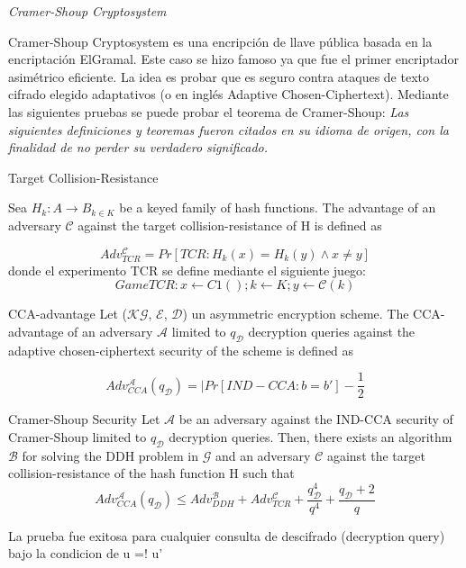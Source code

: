 \documentclass[runningheads,a4paper]{llncs}
\begin{document}
\centerline{\emph{Cramer-Shoup Cryptosystem}}

Cramer-Shoup Cryptosystem es una encripción de llave pública basada en la encriptación ElGramal. Este caso se hizo famoso ya que fue el primer encriptador asimétrico eficiente. La idea es probar que es seguro contra ataques de texto cifrado elegido adaptativos (o en inglés Adaptive Chosen-Ciphertext).
Mediante las siguientes pruebas se puede probar el teorema de Cramer-Shoup:
\emph{Las siguientes definiciones y teoremas fueron citados en su idioma de origen, con la finalidad de no perder su verdadero significado.}
\begin{definition}{Target Collision-Resistance}

Sea $H_k : A \rightarrow B_{k∈K}$ be a keyed family of hash
functions. The advantage of an adversary $\mathcal{C}$ against the target collision-resistance of H is defined as

	\[Adv_{TCR}^\mathcal{C} = Pr[TCR:H_k(x) = H_k (y) \land x \neq y]\]
	donde el experimento TCR se define mediante el siguiente juego:
	\[Game TCR : x \leftarrow C 1 ( ); k \leftarrow K; y \leftarrow \mathcal{C}(k)\]
\end{definition}

\begin{definition}{CCA-advantage}
Let ($\mathcal{K}\mathcal{G}$, $\mathcal{E}$, $\mathcal{D}$) un asymmetric encryption scheme. The CCA-advantage of an adversary $\mathcal{A}$ limited to $q_\mathcal{D}$ decryption queries against the adaptive chosen-ciphertext security of the scheme is defined as

\[Adv_{CCA}^\mathcal{A} (q_\mathcal{D})= |Pr[IND-CCA: b=b'] - \frac{1}{2}\]
\end{definition}

\begin{theorem}{Cramer-Shoup Security}
Let $\mathcal{A}$ be an adversary against the IND-CCA security
of Cramer-Shoup limited to $q_\mathcal{D}$ decryption queries. Then, there exists an algorithm $\mathcal{B}$ for solving the
DDH problem in $\mathcal{G}$ and an adversary $\mathcal{C}$ against the target collision-resistance of the hash function H
such that
\[Adv_{CCA}^\mathcal{A}(q_\mathcal{D}) \leq Adv_{DDH}^\mathcal{B} + Adv_{TCR}^\mathcal{C} + \frac{q_\mathcal{D}^4}{q^4} + \frac{q_\mathcal{D} + 2}{q}\]
\end{theorem}

La prueba fue exitosa para cualquier consulta de descifrado (decryption query) bajo la condicion de u =! u'\cite{article3}
\end{document}
